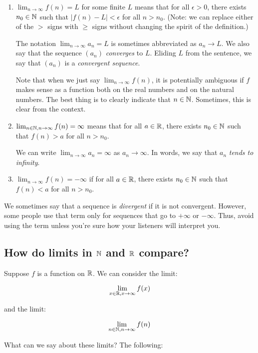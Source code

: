 \documentclass[10pt]{amsart}
\begin{document}
\begin{enumerate}
\item $\lim_{n \to \infty} f(n) = L$ for some finite $L$ means that
  for all $\epsilon > 0$, there exists $n_0 \in \mathbb{N}$ such that $|f(n) -
  L| < \epsilon$ for all $n > n_0$. (Note: we can replace either of
  the $>$ signs with $\geq$ signs without changing the spirit of the
  definition.)


  The notation $\lim_{n \to \infty} a_n = L$ is sometimes abbreviated
  as $a_n \to L$. We also say that the sequence $(a_n)$ {\em converges}
  to $L$. Eliding $L$ from the sentence, we say that $(a_n)$ is a {\em
    convergent sequence}.

  Note that when we just say $\lim_{n \to \infty} f(n)$, it is
  potentially ambiguous if $f$ makes sense as a function both on the
  real numbers and on the natural numbers. The best thing is to
  clearly indicate that $n \in \mathbb{N}$. Sometimes, this is clear from the
  context.

\item $\lim_{n \in \mathbb{N}, n \to \infty} f(n) = \infty$ means that for all
  $a \in \mathbb{R}$, there exists $n_0 \in \mathbb{N}$ such that $f(n) > a$ for all
  $n > n_0$. 

  We can write $\lim_{n \to \infty} a_n = \infty$ as $a_n \to
  \infty$. In words, we say that $a_n$ {\em tends to infinity}. 
  
\item $\lim_{n \to \infty} f(n) = -\infty$ if for all $a \in \mathbb{R}$,
  there exists $n_0 \in \mathbb{N}$ such that $f(n) < a$ for all $n > n_0$.
\end{enumerate}

We sometimes say that a sequence is {\em divergent} if it is not
convergent. However, some people use that term only for sequences that
go to $+\infty$ or $-\infty$. Thus, avoid using the term unless you're
sure how your listeners will interpret you.

\subsection{How do limits in $\mathbb{N}$ and $\mathbb{R}$ compare?}

Suppose $f$ is a function on $\mathbb{R}$. We can consider the limit:

$$\lim_{x \in \mathbb{R}, x \to \infty} f(x)$$

and the limit:

$$\lim_{n \in \mathbb{N}, n \to \infty} f(n)$$

What can we say about these limits? The following:
\end{document}
